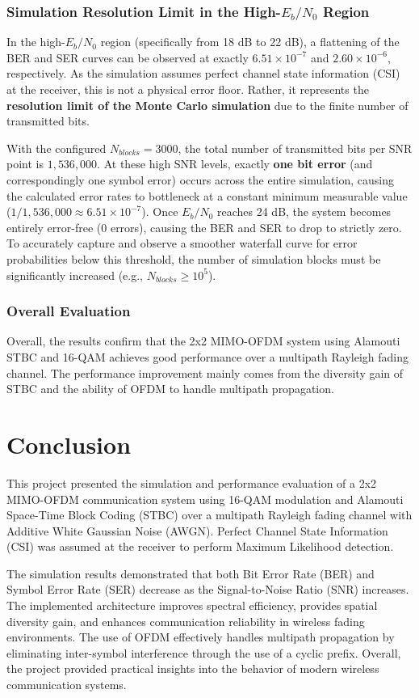 \documentclass[a4paper]{article}
\begin{document}
\subsubsection{Simulation Resolution Limit in the High-$E_b/N_0$ Region}
In the high-$E_b/N_0$ region (specifically from 18 dB to 22 dB), a flattening of the BER and SER curves can be observed at exactly $6.51 \times 10^{-7}$ and $2.60 \times 10^{-6}$, respectively. As the simulation assumes perfect channel state information (CSI) at the receiver, this is not a physical error floor. Rather, it represents the \textbf{resolution limit of the Monte Carlo simulation} due to the finite number of transmitted bits. 

With the configured $N_{blocks} = 3000$, the total number of transmitted bits per SNR point is $1,536,000$. At these high SNR levels, exactly \textbf{one bit error} (and correspondingly one symbol error) occurs across the entire simulation, causing the calculated error rates to bottleneck at a constant minimum measurable value ($1 / 1,536,000 \approx 6.51 \times 10^{-7}$). Once $E_b/N_0$ reaches 24 dB, the system becomes entirely error-free (0 errors), causing the BER and SER to drop to strictly zero. To accurately capture and observe a smoother waterfall curve for error probabilities below this threshold, the number of simulation blocks must be significantly increased (e.g., $N_{blocks} \ge 10^5$).

\subsubsection{Overall Evaluation}
Overall, the results confirm that the 2x2 MIMO-OFDM system using Alamouti STBC and 16-QAM achieves good performance over a multipath Rayleigh fading channel. The performance improvement mainly comes from the diversity gain of STBC and the ability of OFDM to handle multipath propagation.

\section{Conclusion}
This project presented the simulation and performance evaluation of a 2x2 MIMO-OFDM communication system using 16-QAM modulation and Alamouti Space-Time Block Coding (STBC) over a multipath Rayleigh fading channel with Additive White Gaussian Noise (AWGN). Perfect Channel State Information (CSI) was assumed at the receiver to perform Maximum Likelihood detection.

The simulation results demonstrated that both Bit Error Rate (BER) and Symbol Error Rate (SER) decrease as the Signal-to-Noise Ratio (SNR) increases. The implemented architecture improves spectral efficiency, provides spatial diversity gain, and enhances communication reliability in wireless fading environments. The use of OFDM effectively handles multipath propagation by eliminating inter-symbol interference through the use of a cyclic prefix. Overall, the project provided practical insights into the behavior of modern wireless communication systems.
\end{document}
